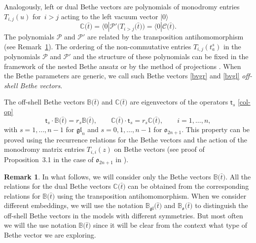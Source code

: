 \documentclass[pdftex]{sigma}
\newcommand{\bt}{{\bar t}}
\theoremstyle{definition}
\newtheorem{rem}[thm]{Remark}
\def\BB{{\mathbb{B}}}
\def\CC{{\mathbb{C}}}
\def\r#1{\eqref{#1}}
\def\rvec{|0\rangle}
\def\lvec{\langle0|}
\def\BBo{\mathbb{B}_{\mathfrak{o}}}
\def\BBg{\mathbb{B}_{\mathfrak{gl}}}
\begin{document}
Analogously, left or dual Bethe vectors
are polynomials of monodromy entries $T_{i,j}(u)$ for~${i > j}$ acting to the left vacuum vector $\rvec$
\begin{equation}\label{bvgl}
\CC\bigl(\bar t\bigr)=\lvec \mathcal{P}'\bigl(T_{i > j}\bigl(\bar t\bigr)\bigr)=\lvec \mathcal{C}\bigl(\bar t\bigr).
\end{equation}
The polynomials $\mathcal{P}$ and $\mathcal{P}'$ are related by the transposition antihomomorphism (see Remark~\ref{rem21}).
The ordering of the non-commutative entries $T_{i,j}(t^s_a)$ in the polynomials
$\mathcal{P}$ and $\mathcal{P}'$ and the structure
 of these polynomials can be fixed in the framework of the
nested Bethe ansatz \cite{KR1, KR2} or by the method of projections
\cite{HLPRS17,KhP-Kyoto}. When the Bethe parameters
are generic, we call such Bethe vectors \r{bvgr} and \r{bvgl} {\it off-shell Bethe vectors}.

 The off-shell Bethe vectors $\BB\bigl(\bt\bigr)$ and
$\CC\bigl(\bt\bigr)$ are eigenvectors of the operators
$\mathsf{t}_s$ \r{col-op}
\[%
\mathsf{t}_s\cdot\BB\bigl(\bt\bigr)=r_s \BB\bigl(\bt\bigr),\qquad \CC\bigl(\bt\bigr)\cdot\mathsf{t}_s=
r_s \CC\bigl(\bt\bigr),\qquad i=1,\dots,n,
\]
with $s=1,\dots,n-1$ for $\mathfrak{gl}_n$
and $s=0,1,\dots,n-1$ for $\mathfrak{o}_{2n+1}$. This property can be proved
using the recurrence relations for the Bethe vectors and the
action of the monodromy matrix entries $T_{i,i}(z)$ on Bethe vectors
(see proof of Proposition~3.1 in the case of $\mathfrak{o}_{2n+1}$ in \cite{LPR25}).

\begin{rem}\label{rem21}
In what follows, we will consider only the Bethe vectors
$\BB\bigl(\bt\bigr)$. All the relations for the dual Bethe vectors $\CC\bigl(\bt\bigr)$
can be obtained from the corresponding relations for $\BB\bigl(\bt\bigr)$
using the transposition antihomomorphism.
When we consider different embeddings, we will
use the notation $\BBg\bigl(\bt\bigr)$ and $\BBo\bigl(\bt\bigr)$ to distinguish the
off-shell Bethe vectors in the models with different symmetries.
But most often we will the use notation $\BB\bigl(\bt\bigr)$
since it will be clear from the context what type of Bethe
vector we are exploring.
\end{rem}
\end{document}
